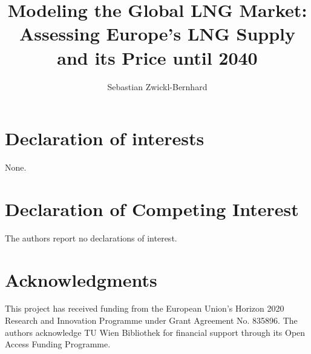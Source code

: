 \documentclass[review]{elsarticle}
\begin{document}
\begin{frontmatter}

\title{Modeling the Global LNG Market:\\Assessing Europe's LNG Supply and its Price until 2040}
\author[1,2]{Sebastian Zwickl-Bernhard}
\address[1]{Energy Economics Group (EEG), Technische Universität Wien, Gusshausstrasse 25-29/E370-3, 1040 Wien, Austria}
\address[2]{Department of Industrial Economics and Technology Management, \protect\\ The Norwegian University of Science and Technology, Trondheim, Norway}


\begin{abstract}
\end{abstract}

\begin{keyword}	
\end{keyword}
\end{frontmatter}


%
%
%
%

\section*{Declaration of interests}
None.
\section*{Declaration of Competing Interest}
The authors report no declarations of interest.
\section*{Acknowledgments}
This project has received funding from the European Union's Horizon 2020 Research and Innovation Programme under Grant Agreement No. 835896. The authors acknowledge TU Wien Bibliothek for financial support through its Open Access Funding Programme.

\appendix
\setcounter{table}{0}
\setcounter{figure}{0}
\end{document}
